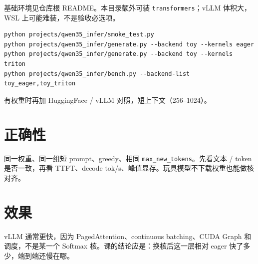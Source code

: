 基础环境见仓库根 README。本目录额外可装 \texttt{transformers}；vLLM 体积大，WSL 上可能难装，不是验收必选项。

\begin{runcmd}
\begin{lstlisting}[style=shell]
python projects/qwen35_infer/smoke_test.py
python projects/qwen35_infer/generate.py --backend toy --kernels eager
python projects/qwen35_infer/generate.py --backend toy --kernels triton
python projects/qwen35_infer/bench.py --backend-list toy_eager,toy_triton
\end{lstlisting}
\end{runcmd}

有权重时再加 HuggingFace / vLLM 对照，短上下文（256--1024）。

\section{正确性}

\begin{note}
同一权重、同一组短 prompt、greedy、相同 \texttt{max\_new\_tokens}。先看文本 / token 是否一致，再看 TTFT、decode tok/s、峰值显存。玩具模型不下载权重也能做核对齐。
\end{note}

\section{效果}

\begin{remark}
vLLM 通常更快，因为 PagedAttention、continuous batching、CUDA Graph 和调度，不是某一个 Softmax 核。课的结论应是：换核后这一层相对 eager 快了多少，端到端还慢在哪。
\end{remark}
